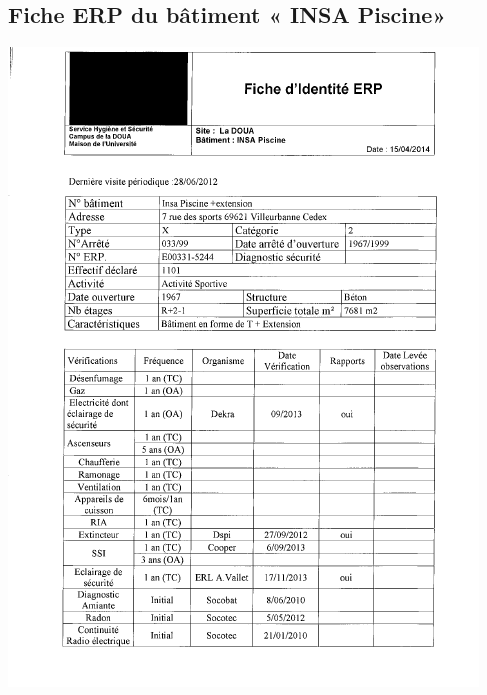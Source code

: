 \documentclass[hidelinks, paper=a4, fontsize=13pt]{report}
\begin{document}
\subsection{Fiche ERP du bâtiment « INSA Piscine»}
\begin{center}
\includegraphics[scale=1.2]{Annexes/Documents/ERPPiscine}
\end{center}
\end{document}
